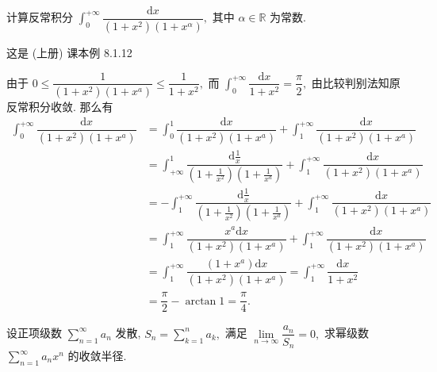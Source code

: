 
\begin{question}[points = 10]
  计算反常积分 $\int_0^{+\infty} \dfrac{\mathrm{d} x}{(1+x^2)(1+x^{\alpha})},$ 其中 $\alpha \in \mathbb{R}$ 为常数.

\end{question}

\begin{solution}
  这是 (上册) 课本例 8.1.12

  由于 $0 \leqslant \dfrac{1}{(1 + x^2)(1 + x^a)} \leqslant \dfrac{1}{1 + x^2},$ 而 $\int_0^{+\infty} \dfrac{\mathrm{d} x}{1 + x^2} = \dfrac{\pi}{2},$ 由比较判别法知原反常积分收敛. 那么有
  \begin{align*}
    \int_0^{+\infty} \dfrac{\mathrm{d} x}{(1 + x^2)(1 + x^a)} & = \int_0^1 \dfrac{\mathrm{d} x}{(1 + x^2)(1 + x^a)} + \int_1^{+\infty} \dfrac{\mathrm{d} x}{(1 + x^2)(1 + x^a)} \\
    & = \int_{+\infty}^1 \dfrac{\mathrm{d} \frac{1}{x}}{(1 + \frac{1}{x^2})(1 + \frac{1}{x^a})} + \int_1^{+\infty} \dfrac{\mathrm{d} x}{(1 + x^2)(1 + x^a)} \\
    & = -\int_1^{+\infty} \dfrac{\mathrm{d} \frac{1}{x}}{(1 + \frac{1}{x^2})(1 + \frac{1}{x^a})} + \int_1^{+\infty} \dfrac{\mathrm{d} x}{(1 + x^2)(1 + x^a)} \\
    & = \int_1^{+\infty} \dfrac{x^a \mathrm{d} x}{(1 + x^2)(1 + x^a)} + \int_1^{+\infty} \dfrac{\mathrm{d} x}{(1 + x^2)(1 + x^a)} \\
    & = \int_1^{+\infty} \dfrac{(1 + x^a) \mathrm{d} x}{(1 + x^2)(1 + x^a)} = \int_1^{+\infty} \dfrac{\mathrm{d} x}{1 + x^2} \\
    & = \dfrac{\pi}{2} - \arctan 1 = \dfrac{\pi}{4}.
  \end{align*}
\end{solution}

\begin{question}[points = 10]
  设正项级数 $\sum\limits_{n=1}^{\infty} a_n$ 发散, $S_n = \sum\limits_{k=1}^{n} a_k,$ 满足 $\lim\limits_{n\to\infty} \dfrac{a_n}{S_n} = 0,$ 求幂级数 $\sum\limits_{n=1}^{\infty} a_n x^n$ 的收敛半径.

\end{question}

